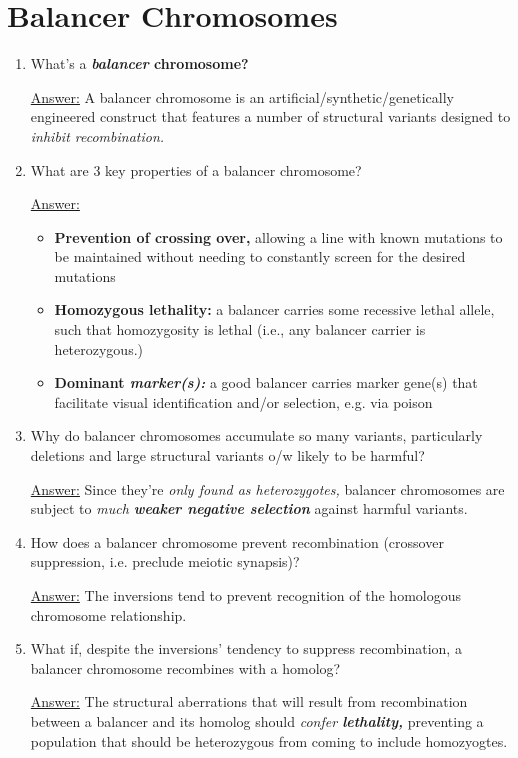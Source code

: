 \documentclass{article}
\newenvironment{QandA}{\begin{enumerate}[label=\bfseries Q\arabic*.]}
                       {\end{enumerate}}
\newenvironment{answered}{\par\normalfont\underline{Answer:}}{}
\begin{document}
\section{Balancer Chromosomes}
\begin{QandA}
  \item{What's a \textbf{\textit{balancer} chromosome?}}
    \begin{answered}
    A balancer chromosome is an artificial/synthetic/genetically engineered construct that features a number of structural variants designed to \textit{inhibit recombination.}
    \end{answered}
  \item{What are 3 key properties of a balancer chromosome?}
    \begin{answered}
    \begin{itemize}
      \item{\textbf{Prevention of crossing over,} allowing a line with known mutations to be maintained without needing to constantly screen for the desired mutations}
      \item{\textbf{Homozygous lethality:} a balancer carries some recessive lethal allele, such that homozygosity is lethal (i.e., any balancer carrier is heterozygous.)}
      \item{\textbf{Dominant \textit{marker(s):}} a good balancer carries marker gene(s) that facilitate visual identification and/or selection, e.g. via poison}
    \end{itemize}
    \end{answered}
  \item{Why do balancer chromosomes accumulate so many variants, particularly deletions and large structural variants o/w likely to be harmful?}
    \begin{answered}
    Since they're \textit{only found as heterozygotes,} balancer chromosomes are subject to \textit{much \textbf{weaker negative selection}} against harmful variants.
    \end{answered}
  \item{How does a balancer chromosome prevent recombination (crossover suppression, i.e. preclude meiotic synapsis)?}
    \begin{answered}
    The inversions tend to prevent recognition of the homologous chromosome relationship.
    \end{answered}
  \item{What if, despite the inversions' tendency to suppress recombination, a balancer chromosome recombines with a homolog?}
    \begin{answered}
    The structural aberrations that will result from recombination between a balancer and its homolog should \textit{confer \textbf{lethality,}} preventing a population that should be heterozygous from coming to include homozyogtes.
    \end{answered}
\end{QandA}
\end{document}
